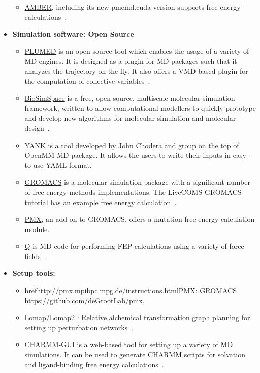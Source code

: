 \documentclass[9pt,bestpractices]{livecoms}
\begin{document}
\begin{itemize}
\begin{itemize}
	\item \href{https://ambermd.org/}{AMBER}, including its new pmemd.cuda version supports free energy calculations~\cite{salomon-ferrer2013overview}. 
	\end{itemize}
\item [] \textbf{Simulation software: Open Source}
	\begin{itemize}
	\item \href{https://www.plumed.org/}{PLUMED} is an open source tool which enables the usage of a variety of MD engines. It is designed as a plugin for MD packages such that it analyzes the trajectory on the fly. It also offers a VMD based plugin for the computation of collective variables~\cite{bonomi2019promoting}.   	
	\item \href{https://biosimspace.org/}{BioSimSpace}  is a free, open source, multiscale molecular simulation framework, written to allow computational modellers to quickly prototype and develop new algorithms for molecular simulation and molecular design~\cite{hedges2019biosimspace}. 
	\item \href{http://getyank.org/latest/index.html}{YANK} is a tool developed by John Chodera and group on the top of OpenMM MD package. It allows the users to write their inputs in easy-to-use YAML format\cite{}.
	\item \href{http://www.gromacs.org/}{GROMACS} is a molecular simulation package with a significant number of free energy methods implementations. The LiveCOMS GROMACS tutorial has an example free energy calculation~\cite{lemkul2018From}.
	\item \href{http://pmx.mpibpc.mpg.de/instructions.html}{PMX}, an add-on to GROMACS, offers a mutation free energy calculation module\cite{abraham2015gromacs}.
	\item \href{https://github.com/qusers/Q6}{Q} is MD code for performing FEP calculations using a variety of force fields~\cite{aqvistjohan2017q6}. 
	\end{itemize}
\item[] \textbf{Setup tools:}
	\begin{itemize}
	\item href{http://pmx.mpibpc.mpg.de/instructions.html}{PMX}: GROMACS \url{https://github.com/deGrootLab/pmx}.
	\item \href{https://github.com/MobleyLab/Lomap}{Lomap/Lomap2} : Relative alchemical transformation graph planning for setting up perturbation networks~\cite{liu2013lead}.
	\item \href{http://www.charmm-gui.org/}{CHARMM-GUI} is a web-based tool for setting up a variety of MD simulations. It can be used to generate CHARMM scripts for solvation and ligand-binding free energy calculations~\cite{jo2008charmmgui}.

\end{itemize}
\end{itemize}
\end{document}
